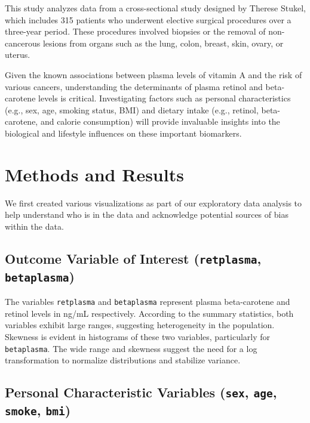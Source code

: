 \documentclass[12pt]{article}
\begin{document}
This study analyzes data from a cross-sectional study designed by
Therese Stukel, which includes 315 patients who underwent elective
surgical procedures over a three-year period. These procedures involved
biopsies or the removal of non-cancerous lesions from organs such as the
lung, colon, breast, skin, ovary, or
uterus\citep{nierenberg_determinants_1989}.

Given the known associations between plasma levels of vitamin A and the
risk of various cancers, understanding the determinants of plasma
retinol and beta-carotene levels is critical. Investigating factors such
as personal characteristics (e.g., sex, age, smoking status, BMI) and
dietary intake (e.g., retinol, beta-carotene, and calorie consumption)
will provide invaluable insights into the biological and lifestyle
influences on these important biomarkers.

\section{Methods and Results}\label{methods-and-results}

We first created various visualizations as part of our exploratory data
analysis to help understand who is in the data and acknowledge potential
sources of bias within the data.

\subsection{\texorpdfstring{Outcome Variable of Interest
(\texttt{retplasma},
\texttt{betaplasma})}{Outcome Variable of Interest (retplasma, betaplasma)}}\label{outcome-variable-of-interest-retplasma-betaplasma}

The variables \texttt{retplasma} and \texttt{betaplasma} represent
plasma beta-carotene and retinol levels in ng/mL respectively. According
to the summary statistics, both variables exhibit large ranges,
suggesting heterogeneity in the population. Skewness is evident in
histograms of these two variables, particularly for \texttt{betaplasma}.
The wide range and skewness suggest the need for a log transformation to
normalize distributions and stabilize variance.

\subsection{\texorpdfstring{Personal Characteristic Variables
(\texttt{sex}, \texttt{age}, \texttt{smoke},
\texttt{bmi})}{Personal Characteristic Variables (sex, age, smoke, bmi)}}\label{personal-characteristic-variables-sex-age-smoke-bmi}
\end{document}
